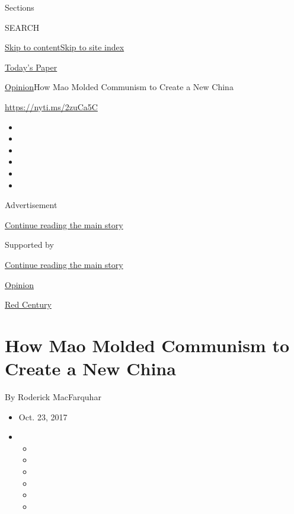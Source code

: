Sections

SEARCH

\protect\hyperlink{site-content}{Skip to
content}\protect\hyperlink{site-index}{Skip to site index}

\href{https://myaccount.nytimes3xbfgragh.onion/auth/login?response_type=cookie\&client_id=vi}{}

\href{https://www.nytimes3xbfgragh.onion/section/todayspaper}{Today's
Paper}

\href{/section/opinion}{Opinion}\textbar{}How Mao Molded Communism to
Create a New China

\url{https://nyti.ms/2zuCa5C}

\begin{itemize}
\item
\item
\item
\item
\item
\item
\end{itemize}

Advertisement

\protect\hyperlink{after-top}{Continue reading the main story}

Supported by

\protect\hyperlink{after-sponsor}{Continue reading the main story}

\href{/section/opinion}{Opinion}

\href{/column/red-century}{Red Century}

\hypertarget{how-mao-molded-communism-to-create-a-new-china}{%
\section{How Mao Molded Communism to Create a New
China}\label{how-mao-molded-communism-to-create-a-new-china}}

By Roderick MacFarquhar

\begin{itemize}
\item
  Oct. 23, 2017
\item
  \begin{itemize}
  \item
  \item
  \item
  \item
  \item
  \item
  \end{itemize}
\end{itemize}

